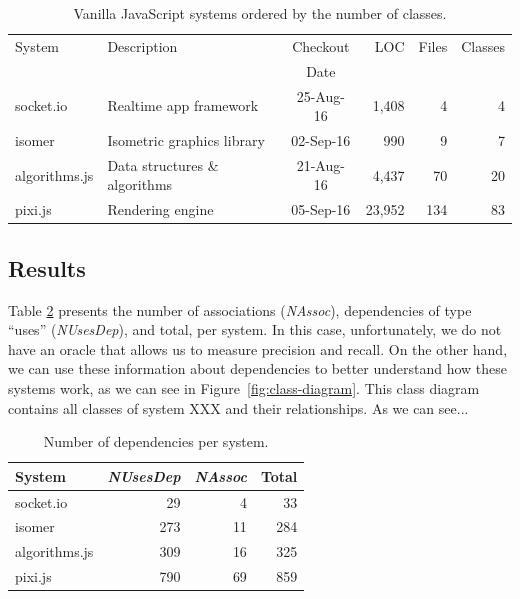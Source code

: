 \documentclass[review]{elsarticle}
\newcommand{\aspas}[1]{{``#1''}}
\begin{document}
\begin{table}[h]%
	\footnotesize
	\centering
	\caption{Vanilla JavaScript systems ordered by the number of classes.}
	\begin{tabular}{llcrrr}
		\toprule
		System              & Description                    & Checkout  & LOC    & Files & Classes   \\
		&                                & Date      &        &          &                      \\
		\midrule
		{\sc socket.io}     & Realtime app framework         & 25-Aug-16 &  1,408 &      4 &        4    \\  
		{\sc isomer}        & Isometric graphics library     & 02-Sep-16 &    990 &      9 &        7   \\  
		{\sc algorithms.js} & Data structures \& algorithms  & 21-Aug-16 &  4,437 &     70 &       20   \\  
		{\sc pixi.js}       & Rendering engine               & 05-Sep-16 & 23,952 &    134 &       83   \\ 
		\bottomrule
	\end{tabular}
	\label{tab:dataset-vanilla}
\end{table}


\subsection{Results}
\label{sec:results-vanilla}

Table \ref{tab:results-vanilla} presents the number of associations (\textit{NAssoc}), dependencies of type \aspas{uses} (\textit{NUsesDep}), and total, per system. In this case, unfortunately, we do not have an oracle that allows us to measure precision and recall. On the other hand, we can use these information about dependencies to better understand how these systems work, as we can see in Figure~\ref{fig:class-diagram}. This class diagram contains all classes of system XXX and their relationships. As we can see... 
 
\begin{table}[hbp]
	\footnotesize
	\centering
	\caption{Number of dependencies per system.}
	\begin{tabular}{lrrr}
		\toprule
		System                & \textit{NUsesDep} & \textit{NAssoc} & Total    \\
		\midrule
		{\sc socket.io}     &                         29 &            4 &    33    \\  
		{\sc isomer}         &                       273 &           11 &   284    \\  
		{\sc algorithms.js} &                     309 &           16 &   325  \\  
		{\sc pixi.js}            &                     790 &           69 &   859     \\ 
		\bottomrule
	\end{tabular}
	\label{tab:results-vanilla}
\end{table}
\end{document}
